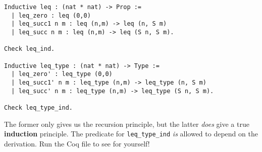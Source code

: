 \documentclass[a4paper, 11pt]{article}
\theoremstyle{definition}
\begin{document}
\begin{lstlisting}
Inductive leq : (nat * nat) -> Prop :=
  | leq_zero : leq (0,0)
  | leq_succ1 n m : leq (n,m) -> leq (n, S m)
  | leq_succ n m : leq (n,m) -> leq (S n, S m).

Check leq_ind.

Inductive leq_type : (nat * nat) -> Type :=
  | leq_zero' : leq_type (0,0)
  | leq_succ1' n m : leq_type (n,m) -> leq_type (n, S m)
  | leq_succ' n m : leq_type (n,m) -> leq_type (S n, S m).

Check leq_type_ind.
\end{lstlisting}

The former only gives us the recursion principle, but the latter \emph{does} give a true \textbf{induction} principle. The predicate for \texttt{leq\_type\_ind} \emph{is} allowed to depend on the derivation. Run the Coq file to see for yourself!
\end{document}
